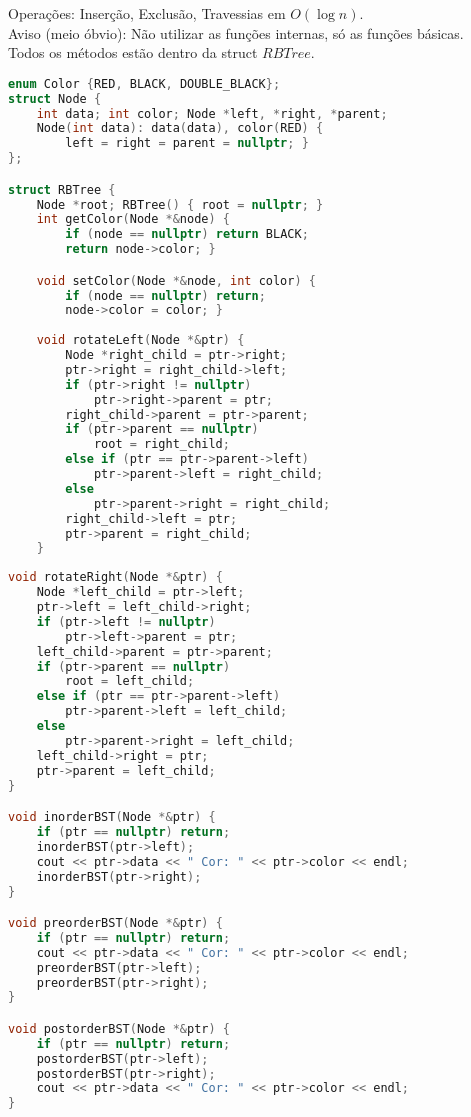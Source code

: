 Operações: Inserção, Exclusão, Travessias em $O(\log{n})$.\\
Aviso (meio óbvio): Não utilizar as funções internas, só as funções básicas.\\
Todos os métodos estão dentro da struct $RBTree$.

\begin{lstlisting}[language=C++, title=Parte I de IV: Base e RotateLeft]
enum Color {RED, BLACK, DOUBLE_BLACK};
struct Node {
	int data; int color; Node *left, *right, *parent;
	Node(int data): data(data), color(RED) {
		left = right = parent = nullptr; }
};

struct RBTree {
	Node *root; RBTree() { root = nullptr; }
	int getColor(Node *&node) {
		if (node == nullptr) return BLACK;
		return node->color; }

	void setColor(Node *&node, int color) {
		if (node == nullptr) return;
		node->color = color; }
		
	void rotateLeft(Node *&ptr) {
		Node *right_child = ptr->right;
		ptr->right = right_child->left;
		if (ptr->right != nullptr)
			ptr->right->parent = ptr;
		right_child->parent = ptr->parent;
		if (ptr->parent == nullptr)
			root = right_child;
		else if (ptr == ptr->parent->left)
			ptr->parent->left = right_child;
		else
			ptr->parent->right = right_child;
		right_child->left = ptr;
		ptr->parent = right_child;
	}
\end{lstlisting}

\newpage

\begin{lstlisting}[language=C++, title=Parte II de IV: RotateRight e Travessias]
void rotateRight(Node *&ptr) {
	Node *left_child = ptr->left;
	ptr->left = left_child->right;
	if (ptr->left != nullptr)
		ptr->left->parent = ptr;
	left_child->parent = ptr->parent;
	if (ptr->parent == nullptr)
		root = left_child;
	else if (ptr == ptr->parent->left)
		ptr->parent->left = left_child;
	else
		ptr->parent->right = left_child;
	left_child->right = ptr;
	ptr->parent = left_child;
}

void inorderBST(Node *&ptr) {
	if (ptr == nullptr) return;
	inorderBST(ptr->left);
	cout << ptr->data << " Cor: " << ptr->color << endl;
	inorderBST(ptr->right);
}

void preorderBST(Node *&ptr) {
	if (ptr == nullptr) return;
	cout << ptr->data << " Cor: " << ptr->color << endl;
	preorderBST(ptr->left);
	preorderBST(ptr->right);
}

void postorderBST(Node *&ptr) {
	if (ptr == nullptr) return;
	postorderBST(ptr->left);
	postorderBST(ptr->right);
	cout << ptr->data << " Cor: " << ptr->color << endl;
}
\end{lstlisting}

